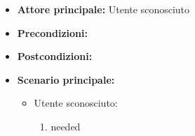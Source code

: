 \label{usecase:Ordine condiviso}
\begin{itemize}
\item \textbf{Attore principale:}  Utente sconosciuto
\item \textbf{Precondizioni:}
\item \textbf{Postcondizioni:}
\item \textbf{Scenario principale:}
\begin{itemize}
\item  Utente sconosciuto:
\begin{enumerate}
\item needed
\end{enumerate}
\end{itemize}
\end{itemize}
